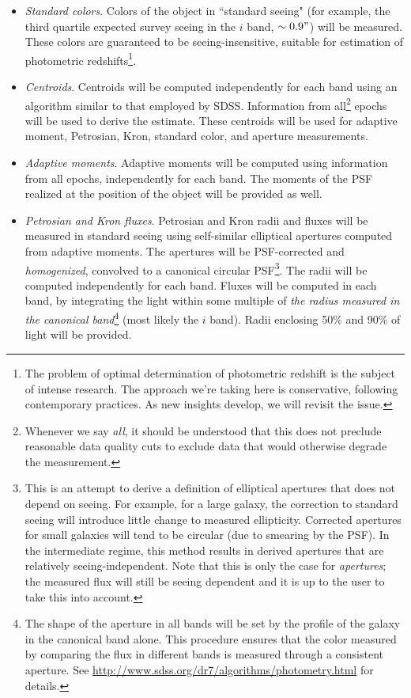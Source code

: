 \documentclass[12pt]{article}
\newcommand{\req}[1]{\marginpar{\tiny #1}}
\newcommand{\dmreq}[1]{\req{DMS-REQ-#1}}
\begin{document}
\begin{itemize}
    \item {\em Standard colors}. \dmreq{0276} Colors of the object in ``standard seeing" (for example, the third quartile expected survey seeing in the $i$ band, $\sim 0.9"$) will be measured. These colors are guaranteed to be seeing-insensitive,  suitable for estimation of photometric redshifts\footnote{The problem of optimal determination of photometric redshift is the subject of intense research. The approach we're taking here is conservative, following contemporary practices. As new insights develop, we will revisit the issue.}.

    \item {\em Centroids}. Centroids will be computed independently for each band using an algorithm similar to that employed by SDSS. Information from all\footnote{Whenever we say {\em all}, it should be understood that this does not preclude reasonable data quality cuts to exclude data that would otherwise degrade the measurement.} epochs will be used to derive the estimate. These centroids will be used for adaptive moment, Petrosian, Kron, standard color, and aperture measurements. \dmreq{0276}

    \item {\em Adaptive moments}. Adaptive moments will be computed using information from all epochs, independently for each band. The moments of the PSF realized at the position of the object will be provided as well. \dmreq{0276}

    \item {\em Petrosian and Kron fluxes}. Petrosian and Kron radii and fluxes will be measured in standard seeing using self-similar elliptical apertures computed from adaptive moments. The apertures will be PSF-corrected and {\em homogenized}, convolved to a canonical circular PSF\footnote{This is an attempt to derive a definition of elliptical apertures that does not depend on seeing. For example, for a large galaxy, the correction to standard seeing will introduce little change to measured ellipticity. Corrected apertures for small galaxies will tend to be circular (due to smearing by the PSF). In the intermediate regime, this method results in derived apertures that are relatively seeing-independent. Note that this is only the case for {\em apertures}; the measured flux will still be seeing dependent and it is up to the user to take this into account.}. The radii will be computed independently for each band. Fluxes will be computed in each band, by integrating the light within some multiple of {\em the radius measured in the canonical band}\footnote{The shape of the aperture in all bands will be set by the profile of the galaxy in the canonical band alone. This procedure ensures that the color measured by comparing the flux in different bands is measured through a consistent aperture. See \url{http://www.sdss.org/dr7/algorithms/photometry.html} for details.} (most likely the $i$ band). Radii enclosing 50\% and 90\% of light will be provided. \dmreq{0276}


\end{itemize}
\end{document}
